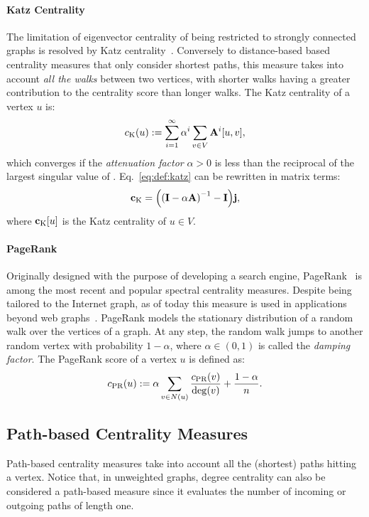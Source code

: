 \paragraph{Katz Centrality}
%
The limitation of eigenvector centrality of being restricted to strongly
connected graphs is resolved by Katz centrality~\cite{katz1953new}. Conversely
to distance-based based centrality measures that only consider shortest paths,
this measure takes into account \emph{all the walks} between two vertices, with
shorter walks having a greater contribution to the centrality score than longer
walks.
%
The Katz centrality of a vertex $u$ is:
%
\begin{equation}
\label{eq:def:katz}
c_{\text{K}}(u) := \sum_{i = 1}^{\infty}\alpha^i \sum_{v\in V} \mathbf{A}^i[u, v],
\end{equation}
%
which converges if the \emph{attenuation factor} $\alpha > 0$ is less than the
reciprocal of the largest singular value of \Adj.
Eq.~\eqref{eq:def:katz} can be rewritten in matrix terms:
%
\begin{equation}
\label{eq:def:katz-alg}
\vect{c}_{\text{K}} = \roundb{\roundb{\Ident - \alpha\Adj}^{-1} - \Ident}\ones,
\end{equation}
%
where $\mathbf{c}_{\text{K}}[u]$ is the Katz centrality of $u\in V$.


\paragraph{PageRank}
Originally designed with the purpose of developing a search engine,
PageRank~\cite{page1999pagerank} is among the most recent and popular spectral
centrality measures.
Despite being tailored to the Internet graph, as of today this measure is used
in applications beyond web graphs~\cite{DBLP:journals/siamrev/Gleich15}.
%
PageRank models the stationary distribution of a random walk over the vertices
of a graph. At any step, the random walk jumps to another random vertex
with probability $1 - \alpha$, where $\alpha \in (0, 1)$ is called
the \emph{damping factor}. The PageRank score of a vertex $u$ is defined as:
%
\[
c_{\text{PR}}(u) := \alpha \sum_{v \in N(u)}\frac{c_{\text{PR}}(v)}{\deg(v)} + \frac{1 - \alpha}{n}.
\]

\subsection{Path-based Centrality Measures}
\label{sec:prelim:path-based-centrality}
%
Path-based centrality measures take into account all the (shortest) paths hitting
a vertex. Notice that, in unweighted graphs, degree centrality can also be
considered a path-based measure since it evaluates the number of incoming or
outgoing paths of length one.

